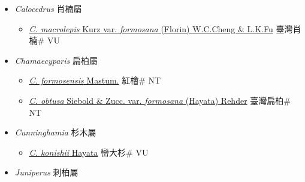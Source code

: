 
  \begin{itemize}
 \item[] \textit{Calocedrus} 肖楠屬
                    
  \begin{itemize}
        \item[] \href{http://www.theplantlist.org/tpl1.1/search?q=Calocedrus+macrolepis+var.+formosana}{\textit{C. macrolepis} Kurz var. \textit{formosana} (Florin) W.C.Cheng \& L.K.Fu}   臺灣肖楠\# VU
  \end{itemize}
 \item[] \textit{Chamaecyparis} 扁柏屬
                    
  \begin{itemize}
        \item[] \href{http://www.theplantlist.org/tpl1.1/search?q=Chamaecyparis+formosensis}{\textit{C. formosensis} Mastum.}   紅檜\# NT
        \item[] \href{http://www.theplantlist.org/tpl1.1/search?q=Chamaecyparis+obtusa+var.+formosana}{\textit{C. obtusa} Siebold \& Zucc. var. \textit{formosana} (Hayata) Rehder}   臺灣扁柏\# NT
  \end{itemize}
 \item[] \textit{Cunninghamia} 杉木屬
                    
  \begin{itemize}
        \item[] \href{http://www.theplantlist.org/tpl1.1/search?q=Cunninghamia+konishii}{\textit{C. konishii} Hayata}   巒大杉\# VU
  \end{itemize}
 \item[] \textit{Juniperus} 刺柏屬
                    

\end{itemize}
